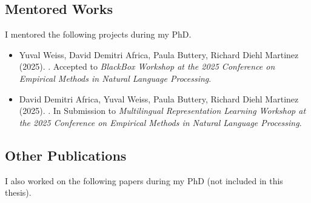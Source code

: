 \newpage

\begin{tcolorbox}[
    enhanced,
    colback=white,
    colframe=thesisblue,
    arc=0mm,
    boxrule=1pt,
    left=10pt,
    right=10pt,
    top=10pt,
    bottom=10pt,
    title=Additional Works,
    fonttitle=\bfseries,
    coltitle=white
]
\subsection*{Mentored Works}
I mentored the following projects during my PhD.

\begin{itemize}
    \item Yuval Weiss, David Demitri Africa,  Paula Buttery, Richard Diehl Martinez (2025). {\color{thesisblue}{Investigating ReLoRA: Effects on the Learning Dynamics of Small Language Models}}. Accepted to \emph{BlackBox Workshop at the 2025 Conference on Empirical Methods in Natural Language Processing}.
    \item David Demitri Africa, Yuval Weiss, Paula Buttery, Richard Diehl Martinez (2025). {\color{thesisblue}{Filipino Zero-Shot Transfer Using Meta-Pretraining for Named Entity Recognition}}. In Submission to \emph{Multilingual Representation Learning Workshop at the 2025 Conference on Empirical Methods in Natural Language Processing}.
\end{itemize}

\subsection*{Other Publications}
I also worked on the following papers during my PhD (not included in this thesis).


\end{tcolorbox}
